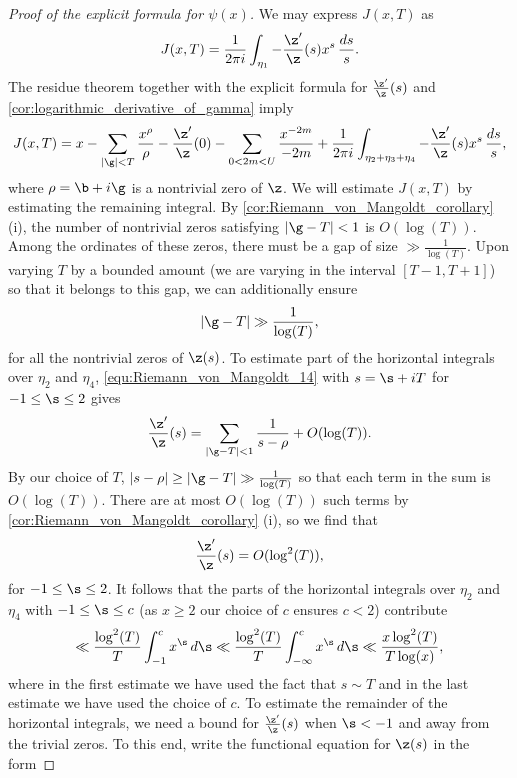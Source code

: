 \begin{proof}[Proof of the explicit formula for $\psi(x)$]
        We may express $J(x,T)$ as
        \[
          J(x,T) = \frac{1}{2\pi i}\int_{\eta_{1}}-\frac{\z'}{\z}(s)x^{s}\,\frac{ds}{s}.
        \]
        The residue theorem together with the explicit formula for $\frac{\z'}{\z}(s)$ and \cref{cor:logarithmic_derivative_of_gamma} imply
        \begin{equation}\label{equ:explicit_formula_zeta_proof_7}
          J(x,T) = x-\sum_{|\g| < T}\frac{x^{\rho}}{\rho}-\frac{\z'}{\z}(0)-\sum_{0 < 2m < U}\frac{x^{-2m}}{-2m}+\frac{1}{2\pi i}\int_{\eta_{2}+\eta_{3}+\eta_{4}}-\frac{\z'}{\z}(s)x^{s}\,\frac{ds}{s},
        \end{equation}
        where $\rho = \b+i\g$ is a nontrivial zero of $\z$. We will estimate $J(x,T)$ by estimating the remaining integral. By \cref{cor:Riemann_von_Mangoldt_corollary} (i), the number of nontrivial zeros satisfying $|\g-T| < 1$ is $O(\log(T))$. Among the ordinates of these zeros, there must be a gap of size $\gg \frac{1}{\log(T)}$. Upon varying $T$ by a bounded amount (we are varying in the interval $[T-1,T+1]$) so that it belongs to this gap, we can additionally ensure
        \[
          |\g-T| \gg \frac{1}{\log(T)},
        \]
        for all the nontrivial zeros of $\z(s)$. To estimate part of the horizontal integrals over $\eta_{2}$ and $\eta_{4}$, \cref{equ:Riemann_von_Mangoldt_14} with $s = \s+iT$ for $-1 \le \s \le 2$ gives
        \[
          \frac{\z'}{\z}(s) = \sum_{|\g-T| < 1}\frac{1}{s-\rho}+O(\log(T)).
        \]
        By our choice of $T$, $|s-\rho| \ge |\g-T| \gg \frac{1}{\log(T)}$ so that each term in the sum is $O(\log(T))$. There are at most $O(\log(T))$ such terms by \cref{cor:Riemann_von_Mangoldt_corollary} (i), so we find that
        \[
          \frac{\z'}{\z}(s) = O(\log^{2}(T)),
        \]
        for $-1 \le \s \le 2$. It follows that the parts of the horizontal integrals over $\eta_{2}$ and $\eta_{4}$ with  $-1 \le \s \le c$ (as $x \ge 2$ our choice of $c$ ensures $c < 2$) contribute
        \begin{equation}\label{equ:explicit_formula_zeta_proof_8}
          \ll \frac{\log^{2}(T)}{T}\int_{-1}^{c}x^{\s}\,d\s \ll \frac{\log^{2}(T)}{T}\int_{-\infty}^{c}x^{\s}\,d\s \ll \frac{x\log^{2}(T)}{T\log(x)},
        \end{equation}
        where in the first estimate we have used the fact that $s \sim T$ and in the last estimate we have used the choice of $c$. To estimate the remainder of the horizontal integrals, we need a bound for $\frac{\z'}{\z}(s)$ when $\s < -1$ and away from the trivial zeros. To this end, write the functional equation for $\z(s)$ in the form

\end{proof}
